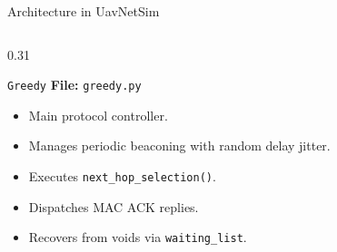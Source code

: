 \documentclass[aspectratio=169,10pt]{beamer}
\begin{document}
\begin{frame}{Architecture in UavNetSim}
\begin{columns}[T]
    \begin{column}{0.31\textwidth}
      \begin{block}{\texttt{Greedy}}
        \scriptsize
        \textbf{File:} \texttt{greedy.py}
        \begin{itemize}\setlength{\itemsep}{0.3em}
          \item Main protocol controller.
          \item Manages periodic beaconing with random delay jitter.
          \item Executes \texttt{next\_hop\_selection()}.
          \item Dispatches MAC ACK replies.
          \item Recovers from voids via \texttt{waiting\_list}.
        \end{itemize}
      \end{block}
    \end{column}
  \end{columns}
\end{frame}
\end{document}

